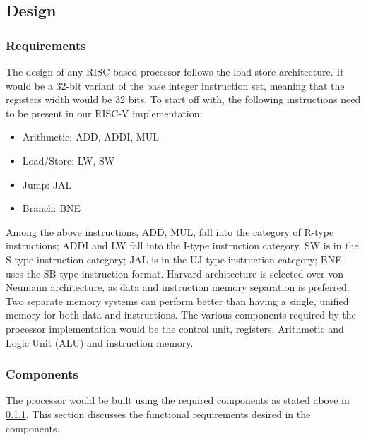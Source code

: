 \subsection{Design}
\label{sect6_4_2}
\subsubsection{Requirements}
\label{section:sect6_4_2_1}
The design of any RISC based processor follows the load store architecture. It would be a 32-bit variant of the base integer instruction set, meaning that the registers width would be 32 bits. To start off with, the following instructions need to be present in our RISC-V implementation:
\begin{itemize}
\item Arithmetic: ADD, ADDI, MUL
\item Load/Store: LW, SW
\item Jump: JAL
\item Branch: BNE
\end{itemize}
Among the above instructions, ADD, MUL, fall into the category of R-type instructions; ADDI and LW fall into the I-type instruction category, SW is in the S-type instruction category; JAL is in the UJ-type instruction category; BNE uses the SB-type instruction format. \newline\newline
Harvard architecture is selected over von Neumann architecture, as data and instruction memory separation is preferred. Two separate memory systems can perform better than having a single, unified memory for both data and instructions. The various components required by the processor implementation would be the control unit, registers, Arithmetic and Logic Unit (ALU) and instruction memory.

\subsubsection{Components}
\label{sect6_4_2_2}
The processor would be built using the required components as stated above in \ref{section:sect6_4_2_1}. This section discusses the functional requirements desired in the components.

